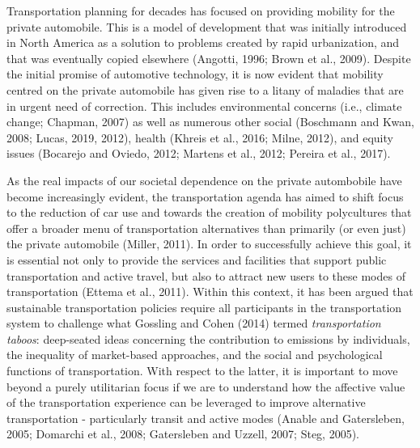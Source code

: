 \documentclass[]{elsarticle} %
\begin{document}
Transportation planning for decades has focused on providing mobility
for the private automobile. This is a model of development that was
initially introduced in North America as a solution to problems created
by rapid urbanization, and that was eventually copied elsewhere
(Angotti, 1996; Brown et al., 2009). Despite the initial promise of
automotive technology, it is now evident that mobility centred on the
private automobile has given rise to a litany of maladies that are in
urgent need of correction. This includes environmental concerns (i.e.,
climate change; Chapman, 2007) as well as numerous other social
(Boschmann and Kwan, 2008; Lucas, 2019, 2012), health (Khreis et al.,
2016; Milne, 2012), and equity issues (Bocarejo and Oviedo, 2012;
Martens et al., 2012; Pereira et al., 2017).

As the real impacts of our societal dependence on the private
autombobile have become increasingly evident, the transportation agenda
has aimed to shift focus to the reduction of car use and towards the
creation of mobility polycultures that offer a broader menu of
transportation alternatives than primarily (or even just) the private
automobile (Miller, 2011). In order to successfully achieve this goal,
it is essential not only to provide the services and facilities that
support public transportation and active travel, but also to attract new
users to these modes of transportation (Ettema et al., 2011). Within
this context, it has been argued that sustainable transportation
policies require all participants in the transportation system to
challenge what Gossling and Cohen (2014) termed \emph{transportation
taboos}: deep-seated ideas concerning the contribution to emissions by
individuals, the inequality of market-based approaches, and the social
and psychological functions of transportation. With respect to the
latter, it is important to move beyond a purely utilitarian focus if we
are to understand how the affective value of the transportation
experience can be leveraged to improve alternative transportation -
particularly transit and active modes (Anable and Gatersleben, 2005;
Domarchi et al., 2008; Gatersleben and Uzzell, 2007; Steg, 2005).
\end{document}
